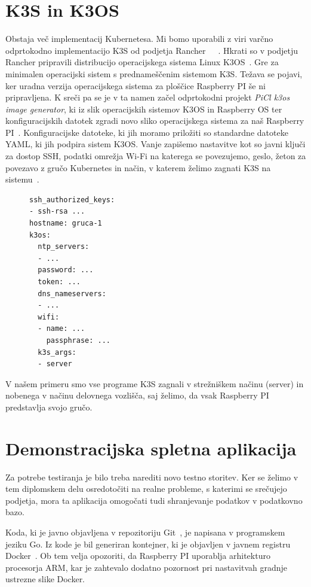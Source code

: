 \documentclass[a4paper, 12pt]{book}
\begin{document}
\section{K3S in K3OS}
Obstaja več implementacij Kubernetesa.
Mi bomo uporabili z viri varčno odprtokodno implementacijo K3S od podjetja Rancher~\cite{k3s-info}~\cite{k8s-performance-comparison}~\cite{low-resource-k8s}.
Hkrati so v podjetju Rancher pripravili distribucijo operacijskega sistema Linux K3OS~\cite{k3os-git}.
Gre za minimalen operacijski sistem s prednameščenim sistemom K3S.
Te\-ža\-va se pojavi, ker uradna verzija operacijskega sistema za ploščice Raspberry PI še ni pripravljena.
K sreči pa se je v ta namen začel odprtokodni projekt \emph{PiCl k3os image generator}, ki iz slik operacijskih sistemov K3OS in Raspberry OS ter konfiguracijskih datotek zgradi novo sliko operacijskega sistema za naš Raspberry PI~\cite{k3os-rpi-image-generator}.
Konfiguracijske datoteke, ki jih moramo priložiti so standardne datoteke YAML, ki jih podpira sistem K3OS.
Vanje zapišemo nastavitve kot so javni ključi za dostop SSH, podatki omrežja Wi-Fi na katerega se povezujemo, geslo, žeton za povezavo z gručo Kubernetes in način, v katerem želimo zagnati K3S na sistemu~\cite{k3os-git}.
\begin{figure}[h]
  \begin{verbatim}
ssh_authorized_keys:
- ssh-rsa ...
hostname: gruca-1
k3os:
  ntp_servers:
  - ...
  password: ...
  token: ...
  dns_nameservers:
  - ... 
  wifi:
  - name: ...
    passphrase: ...
  k3s_args:
  - server
\end{verbatim}
\end{figure}

V našem primeru smo vse programe K3S zagnali v strežniškem načinu (server) in nobenega v načinu delovnega vozlišča, saj želimo, da vsak Raspberry PI predstavlja svojo gručo.
\section{Demonstracijska spletna aplikacija}
Za potrebe testiranja je bilo treba narediti novo testno storitev.
Ker se želimo v tem diplomskem delu osredotočiti na realne probleme, s katerimi se srečujejo podjetja, mora ta aplikacija omogočati tudi shranjevanje podatkov v podatkovno bazo.

Koda, ki je javno objavljena v repozitoriju Git~\cite{git-stateful-rest-sample}, je napisana v programskem jeziku Go.
Iz kode je bil generiran kontejner, ki je objavljen v javnem registru Docker~\cite{docker-stateful-rest-sample}.
Ob tem velja opozoriti, da Raspberry PI uporablja arhitekturo procesorja ARM, kar je zahtevalo dodatno pozornost pri nastavitvah gradnje ustrezne slike Docker.
\end{document}
